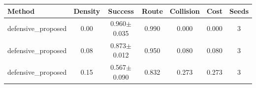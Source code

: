 \begin{tabular}{lcccccc}
\toprule
Method & Density & Success & Route & Collision & Cost & Seeds \\ 
\midrule
defensive_proposed & 0.00 & 0.960$\pm$0.035 & 0.990 & 0.000 & 0.000 & 3 \\ 
defensive_proposed & 0.08 & 0.873$\pm$0.012 & 0.950 & 0.080 & 0.080 & 3 \\ 
defensive_proposed & 0.15 & 0.567$\pm$0.090 & 0.832 & 0.273 & 0.273 & 3 \\ 
\bottomrule
\end{tabular}
